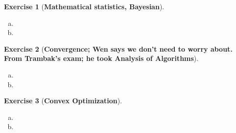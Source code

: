 \documentclass{article}
\theoremstyle{definition}
\newtheorem{exercise}{Exercise}
\theoremstyle{definition}
\theoremstyle{definition}
\theoremstyle{definition}
\begin{document}
\begin{exercise}[\textbf{Mathematical statistics, Bayesian}]

\begin{enumerate}[(a)]

\item

\item

\end{enumerate}

\end{exercise}

\begin{exercise}[\textbf{Convergence; Wen says we don't need to worry about. From Trambak's exam; he took Analysis of Algorithms}]

\begin{enumerate}[(a)]

\item

\item

\end{enumerate}

\end{exercise}

\begin{exercise}[\textbf{Convex Optimization}]

\begin{enumerate}[(a)]

\item

\item

\end{enumerate}

\end{exercise}
\end{document}

